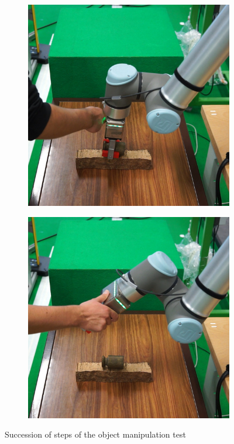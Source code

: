 \begin{figure}[h]
\begin{subfigure}{.2\linewidth}
    \end{subfigure}%
    \begin{subfigure}{.2\linewidth}
        \centering
        \includegraphics[width=.95\linewidth]{figs/chp6/om_test_8.jpg}
    \end{subfigure}%
    \begin{subfigure}{.2\linewidth}
        \centering
        \includegraphics[width=.95\linewidth]{figs/chp6/om_test_9.jpg}
    \end{subfigure}
    \caption{Succession of steps of the object manipulation test}
    \label{fig:om_test}
\end{figure}

